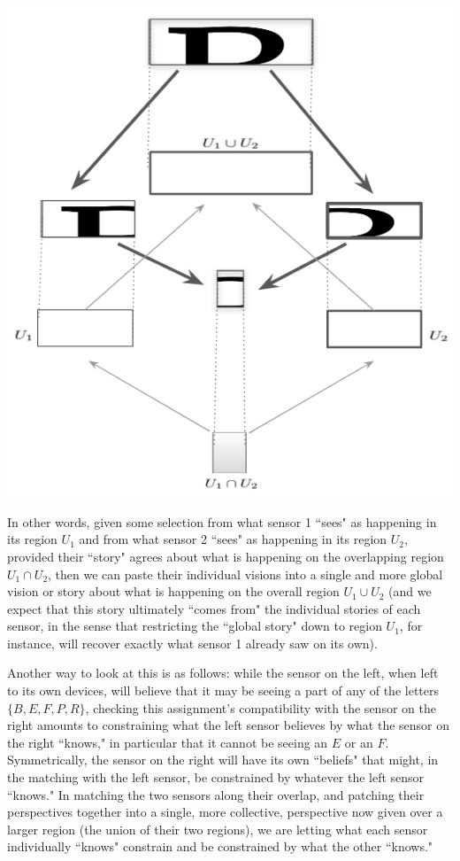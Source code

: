 \documentclass[a4paper]{book}
\theoremstyle{definition}
\theoremstyle{definition}
\theoremstyle{definition}
\theoremstyle{theorem}
\theoremstyle{definition}
\begin{document}
	\begin{center}
		\includegraphics[scale=0.3]{GoodDiagramB3.png}
	\end{center}
	In other words, given some selection from what sensor 1 ``sees" as happening in its region $U_1$ and from what sensor 2 ``sees" as happening in its region $U_2$, provided their ``story" agrees about what is happening on the overlapping region $U_1 \cap U_2$, then we can paste their individual visions into a single and more global vision or story about what is happening on the overall region $U_1 \cup U_2$ (and we expect that this story ultimately ``comes from" the individual stories of each sensor, in the sense that restricting the ``global story" down to region $U_1$, for instance, will recover exactly what sensor 1 already saw on its own). \par 
	Another way to look at this is as follows: while the sensor on the left, when left to its own devices, will believe that it may be seeing a part of any of the letters $\{B, E, F, P, R\}$, checking this assignment's compatibility with the sensor on the right amounts to constraining what the left sensor believes by what the sensor on the right ``knows," in particular that it cannot be seeing an $E$ or an $F$. Symmetrically, the sensor on the right will have its own ``beliefs" that might, in the matching with the left sensor, be constrained by whatever the left sensor ``knows." In matching the two sensors along their overlap, and patching their perspectives together into a single, more collective, perspective now given over a larger region (the union of their two regions), we are letting what each sensor individually ``knows" constrain and be constrained by what the other ``knows." \par 
\end{document}
